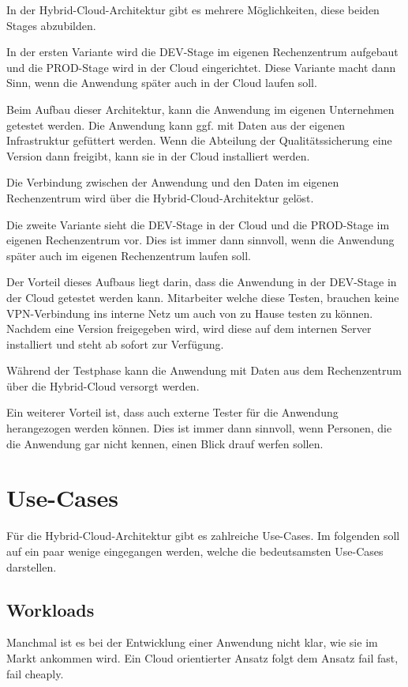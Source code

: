 In der Hybrid-Cloud-Architektur gibt es mehrere Möglichkeiten, diese beiden Stages abzubilden.

In der ersten Variante wird die DEV-Stage im eigenen Rechenzentrum aufgebaut und die PROD-Stage wird in der Cloud
eingerichtet. Diese Variante macht dann Sinn, wenn die Anwendung später auch in der Cloud laufen soll.

Beim Aufbau dieser Architektur, kann die Anwendung im eigenen Unternehmen getestet werden. Die Anwendung kann ggf. mit
Daten aus der eigenen Infrastruktur gefüttert werden. Wenn die Abteilung der Qualitätssicherung eine Version dann freigibt,
kann sie in der Cloud installiert werden.

Die Verbindung zwischen der Anwendung und den Daten im eigenen Rechenzentrum wird über die Hybrid-Cloud-Architektur gelöst.

Die zweite Variante sieht die DEV-Stage in der Cloud und die PROD-Stage im eigenen Rechenzentrum vor. Dies ist immer dann
sinnvoll, wenn die Anwendung später auch im eigenen Rechenzentrum laufen soll.

Der Vorteil dieses Aufbaus liegt darin, dass die Anwendung in der DEV-Stage in der Cloud getestet werden kann. Mitarbeiter
welche diese Testen, brauchen keine VPN-Verbindung ins interne Netz um auch von zu Hause testen zu können. Nachdem eine
Version freigegeben wird, wird diese auf dem internen Server installiert und steht ab sofort zur Verfügung.

Während der Testphase kann die Anwendung mit Daten aus dem Rechenzentrum über die Hybrid-Cloud versorgt werden.

Ein weiterer Vorteil ist, dass auch externe Tester für die Anwendung herangezogen werden können. Dies ist immer dann
sinnvoll, wenn Personen, die die Anwendung gar nicht kennen, einen Blick drauf werfen sollen.

\section{Use-Cases}
Für die Hybrid-Cloud-Architektur gibt es zahlreiche Use-Cases. Im folgenden soll auf ein paar wenige eingegangen werden,
welche die bedeutsamsten Use-Cases darstellen.

\subsection{Workloads}
Manchmal ist es bei der Entwicklung einer Anwendung nicht klar, wie sie im Markt ankommen wird. Ein
Cloud orientierter Ansatz folgt dem Ansatz \glqq fail fast, fail cheaply\grqq.

